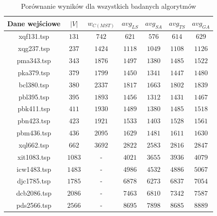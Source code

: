 \documentclass[12pt]{article}
\begin{document}
    \begin{table}[h!]
        \centering
        \begin{tabularx}{0.71\textwidth}{| c | c | c | c | c | c | c |}
            \hline
            Dane wejściowe & $|V|$ & $w_{C(MST)}$ & $avg_{LS}$ & $avg_{SA}$ & $avg_{TS}$ & $avg_{GA}$ \\
            \hline
            xqf131.tsp  &$131$  & $742$  & $621$  & $576$  & $614$  & $629$  \\
            xqg237.tsp  &$237$  & $1424$ & $1118$ & $1049$ & $1108$ & $1126$ \\
            pma343.tsp  &$343$  & $1876$ & $1497$ & $1380$ & $1485$ & $1522$ \\
            pka379.tsp  &$379$  & $1799$ & $1450$ & $1341$ & $1447$ & $1480$ \\
            bcl380.tsp  &$380$  & $2337$ & $1817$ & $1663$ & $1802$ & $1839$ \\
            pbl395.tsp  &$395$  & $1893$ & $1456$ & $1312$ & $1431$ & $1467$ \\
            pbk411.tsp  &$411$  & $1930$ & $1489$ & $1380$ & $1485$ & $1518$ \\
            pbn423.tsp  &$423$  & $1921$ & $1533$ & $1403$ & $1528$ & $1561$ \\
            pbm436.tsp  &$436$  & $2095$ & $1629$ & $1481$ & $1611$ & $1630$ \\
            xql662.tsp  &$662$  & $3692$ & $2822$ & $2583$ & $2816$ & $2847$ \\
            xit1083.tsp &$1083$ & -      & $4021$ & $3655$ & $3936$ & $4079$ \\
            icw1483.tsp &$1483$ & -      & $4986$ & $4532$ & $4886$ & $5067$ \\
            djc1785.tsp &$1785$ & -      & $6878$ & $6273$ & $6837$ & $7054$ \\
            dcb2086.tsp &$2086$ & -      & $7463$ & $6810$ & $7342$ & $7587$ \\
            pds2566.tsp &$2566$ & -      & $8695$ & $7898$ & $8685$ & $8889$ \\
            \hline
        \end{tabularx}
        \label{table:results_comparison}
        \caption{Porównanie wyników dla wszystkich badanych algorytmów}
        \end{table}

        \newpage
\end{document}
